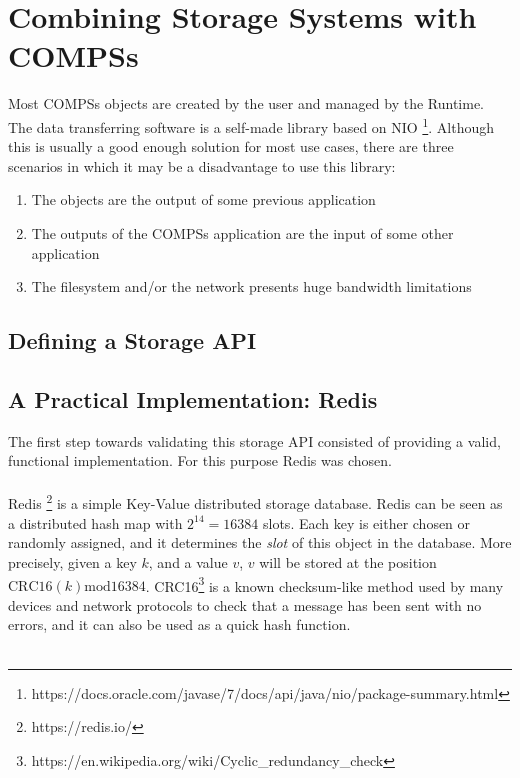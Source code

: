 \section{Combining Storage Systems with COMPSs}
\label{sec:storage}
Most COMPSs objects are created by the user and managed by the Runtime. The data transferring software is a self-made library based on NIO \footnote{https://docs.oracle.com/javase/7/docs/api/java/nio/package-summary.html}. Although this is usually a good enough solution for most use cases, there are three scenarios in which it may be a disadvantage to use this library:

\begin{enumerate}
\item The objects are the output of some previous application
\item The outputs of the COMPSs application are the input of some other application
\item The filesystem and/or the network presents huge bandwidth limitations
\end{enumerate}

\subsection{Defining a Storage API}
\label{subsec:storage_api}

\subsection{A Practical Implementation: Redis}
\label{subsec:storage_redis}
The first step towards validating this storage API consisted of providing a valid, functional implementation. For this purpose Redis was chosen.\\
\\
Redis \footnote{https://redis.io/} is a simple Key-Value distributed storage database. Redis can be seen as a distributed hash map with $2^14 = 16384$ slots. Each key is either chosen or randomly assigned, and it determines the \textit{slot} of this object in the database. More precisely, given a key $k$, and a value $v$, $v$ will be stored at the position $\textrm{CRC16}(k) \textrm{mod} 16384$. CRC16\footnote{https://en.wikipedia.org/wiki/Cyclic\_redundancy\_check} is a known checksum-like method used by many devices and network protocols to check that a message has been sent with no errors, and it can also be used as a quick hash function.\\
\\
